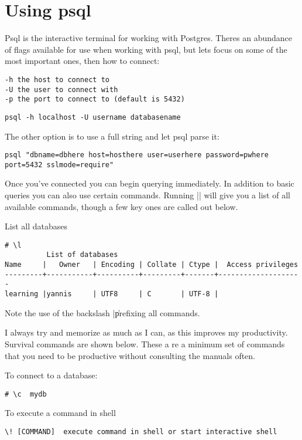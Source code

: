 \chapter{Using psql}

Psql is the interactive terminal for working with Postgres. Theres an abundance of flags available for use when working with psql, but lets focus on some of the most important ones, then how to connect:

\begin{verbatim}
-h the host to connect to
-U the user to connect with
-p the port to connect to (default is 5432)
\end{verbatim}


\begin{verbatim}
psql -h localhost -U username databasename
\end{verbatim}

The other option is to use a full string and let psql parse it:

\begin{verbatim}
psql "dbname=dbhere host=hosthere user=userhere password=pwhere port=5432 sslmode=require"
\end{verbatim}


Once you've connected you can begin querying immediately. In addition to basic queries you can also use certain commands. Running |\?| will give you a list of all available commands, though a few key ones are called out below.

List all databases

\begin{verbatim}
# \l
          List of databases
Name     |   Owner   | Encoding | Collate | Ctype |  Access privileges
---------+-----------+----------+---------+-------+--------------------
learning |yannis     | UTF8     | C       | UTF-8 |
\end{verbatim}

Note the use of the backslash |\| prefixing all commands.

I always try and memorize as much as I can, as this improves my productivity. Survival commands are shown below. These a re a minimum set of commands that you need to be productive without consulting the manuals often.

To connect to a database:

\begin{verbatim}
# \c  mydb
\end{verbatim}


To execute a command in shell

\begin{verbatim}
\! [COMMAND]  execute command in shell or start interactive shell
\end{verbatim}








